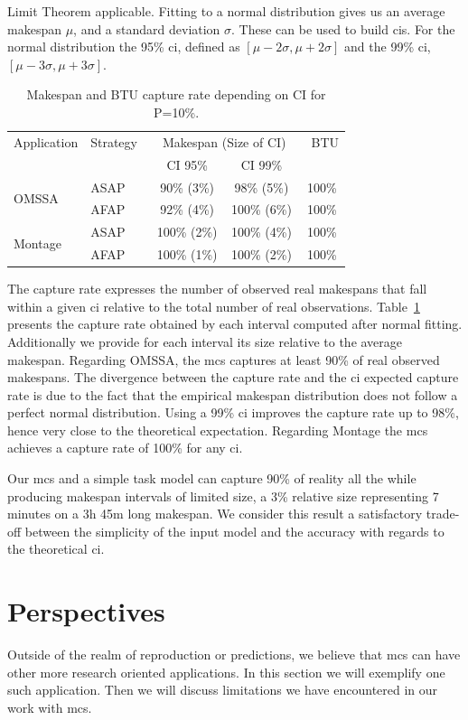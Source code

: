 \documentclass[]{llncs}
\begin{document}
Limit Theorem applicable.  Fitting to a normal distribution gives us an average
makespan $\mu{}$, and a standard deviation $\sigma{}$. These can be used to
build \acp{ci}. For the normal distribution  the 95\% \ac{ci}, defined  as
$[\mu{}-2\sigma{},\mu{}+2\sigma{}]$  and   the  99\%   \ac{ci},
$[\mu{}-3\sigma{},\mu{}+3\sigma{}]$.
%
\begin{table}[b]
	\centering
	\caption{Makespan and BTU capture rate depending on CI
          for P=10\%.}
       \label{tab:fit} 
	\begin{tabular}{llccc}
		\toprule
		Application&Strategy~&\multicolumn{2}{c}{~Makespan (Size of
		CI)~}&~BTU\\
                           &         & CI 95\% & CI 99\% &\\
		\midrule
		\multirow{2}{*}{OMSSA}&ASAP&  90\% (3\%)&  98\% (5\%)& 100\%\\
				      &AFAP&  92\% (4\%)& 100\% (6\%)& 100\%\\
		\midrule
		\multirow{2}{*}{Montage}&ASAP& 100\% (2\%)& 100\% (4\%)& 100\%\\
					&AFAP& 100\% (1\%)& 100\% (2\%)& 100\%\\
		\bottomrule
	\end{tabular}
\end{table}
%
The capture rate expresses the number of observed real makespans that fall
within a given \ac{ci} relative to the total number of real observations.
Table~\ref{tab:fit} presents the capture rate obtained by each interval computed
after normal fitting.  Additionally we provide for each interval its size
relative to the average makespan.
%
Regarding OMSSA, the  \ac{mcs} captures at least 90\% of real observed
makespans. The divergence between the capture rate and the \ac{ci} expected
capture  rate is due  to the fact that the  empirical makespan distribution does
not follow a perfect normal distribution. Using  a 99\% \ac{ci} improves the
capture  rate up to  98\%, hence very close to the theoretical expectation.
Regarding Montage the \ac{mcs} achieves a capture rate of 100\% for any
\ac{ci}.


Our \ac{mcs} and a simple task model can capture 90\% of reality all the while
producing makespan intervals of limited size, a 3\% relative size representing 7
minutes on a 3h 45m long makespan. We consider this result a satisfactory
trade-off between the simplicity of the input model and the accuracy with
regards to the theoretical \ac{ci}.


\section{Perspectives}
\label{sec:disc}
Outside of the realm of reproduction or predictions, we believe that \ac{mcs}
can have other more research oriented applications. In this section we will
exemplify one such application. Then we will discuss limitations we have
encountered in our work with \ac{mcs}.
\end{document}
